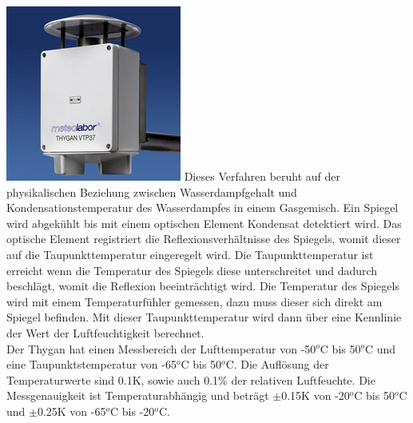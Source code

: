 \newpage
{}
\begin{multicols}{3}
{ \centering
\includegraphics[width=\columnwidth]{graphics/thygan.jpg}
\label{thygan}
}
\vfill\columnbreak
Dieses Verfahren beruht auf der physikalischen Beziehung zwischen Wasserdampfgehalt und Kondensationstemperatur des Wasserdampfes in einem Gasgemisch. Ein Spiegel wird abgekühlt bis mit einem optischen Element Kondensat detektiert wird. Das optische Element registriert die Reflexionsverhältnisse des Spiegels, womit dieser auf die Taupunkttemperatur eingeregelt wird. Die Taupunkttemperatur ist erreicht wenn die Temperatur des Spiegels diese unterschreitet und dadurch beschlägt, womit die Reflexion beeinträchtigt wird. Die Temperatur des Spiegels wird mit einem Temperaturfühler gemessen, dazu muss dieser sich direkt am Spiegel befinden. Mit dieser Taupunkttemperatur wird dann über eine Kennlinie der Wert der Luftfeuchtigkeit berechnet. \cite{Hesse2014}\cite{MeteoSchweiz2014}\\[0.5cm]
Der Thygan hat einen Messbereich der Lufttemperatur von -50$^{o}$C bis 50$^{o}$C und eine Taupunktstemperatur von -65$^{o}$C bis 50$^{o}$C. Die Auflösung der Temperaturwerte sind 0.1K, sowie auch 0.1\% der relativen Luftfeuchte. Die Messgenauigkeit ist Temperaturabhängig und beträgt $\pm$0.15K von -20$^{o}$C bis 50$^{o}$C und $\pm$0.25K von -65$^{o}$C bis -20$^{o}$C. \cite{Meteolabor2018}

\end{multicols} 

